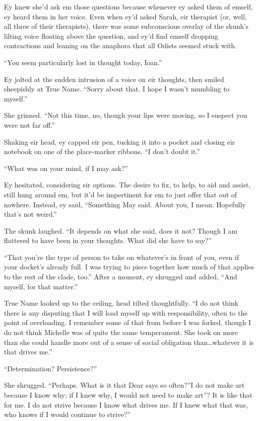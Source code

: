 Ey knew she'd ask em those questions because whenever ey asked them of emself, ey heard them in her voice. Even when ey'd asked Sarah, eir therapist (or, well, all three of their therapists), there was some subconscious overlay of the skunk's lilting voice floating above the question, and ey'd find emself dropping contractions and leaning on the anaphora that all Odists seemed stuck with.

``You seem particularly lost in thought today, Ioan.''

Ey jolted at the sudden intrusion of a voice on eir thoughts, then smiled sheepishly at True Name. ``Sorry about that. I hope I wasn't mumbling to myself.''

She grinned. ``Not this time, no, though your lips were moving, so I suspect you were not far off.''

Shaking eir head, ey capped eir pen, tucking it into a pocket and closing eir notebook on one of the place-marker ribbons. ``I don't doubt it.''

``What was on your mind, if I may ask?''

Ey hesitated, considering eir options. The desire to fix, to help, to aid and assist, still hung around em, but it'd be impertinent for em to just offer that out of nowhere. Instead, ey said, ``Something May said. About you, I mean. Hopefully that's not weird.''

The skunk laughed. ``It depends on what she said, does it not? Though I am flattered to have been in your thoughts. What did she have to say?''

``That you're the type of person to take on whatever's in front of you, even if your docket's already full. I was trying to piece together how much of that applies to the rest of the clade, too.'' After a moment, ey shrugged and added, ``And myself, for that matter.''

True Name looked up to the ceiling, head tilted thoughtfully. ``I do not think there is any disputing that I will load myself up with responsibility, often to the point of overloading. I remember some of that from before I was forked, though I do not think Michelle was of quite the same temperament. She took on more than she could handle more out of a sense of social obligation than\ldots whatever it is that drives me.''

``Determination? Persistence?''

She shrugged. ``Perhaps. What is it that Dear says so often?''I do not make art because I know why; if I knew why, I would not need to make art''? It is like that for me. I do not strive because I know what drives me. If I knew what that was, who knows if I would continue to strive?''


